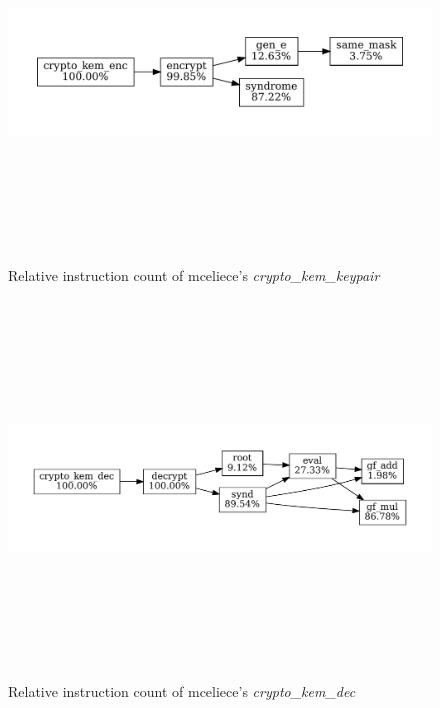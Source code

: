 \begin{figure}[H]
    \centering
    \includegraphics[width=15cm, height=10cm, keepaspectratio]{chapters/results/hot-paths/classic-mceliece/8192128/crypto_kem_enc.pdf}
    \caption{Relative instruction count of \gls{mceliece}'s \textit{crypto\_kem\_keypair}}
    \label{figure:result:hot-paths:classic-mceliece:crypto_kem_enc}
\end{figure}

\begin{figure}[H]
    \centering
    \includegraphics[width=15cm, height=10cm, keepaspectratio]{chapters/results/hot-paths/classic-mceliece/8192128/crypto_kem_dec.pdf}
    \caption{Relative instruction count of \gls{mceliece}'s \textit{crypto\_kem\_dec}}
    \label{figure:result:hot-paths:classic-mceliece:crypto_kem_dec}
\end{figure}

